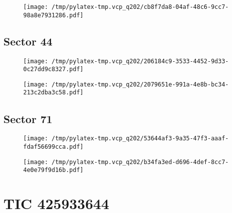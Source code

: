 \documentclass{report}%
\begin{document}
%


\begin{figure}[H]%
\begin{center}%
\centering%
\texttt{[image: /tmp/pylatex-tmp.vcp\_q202/cb8f7da8-04af-48c6-9cc7-98a8e7931286.pdf]}%
\end{center}%
\end{figure}

%
\subsection{Sector 44}%
\label{subsec:5983663344}%


\begin{figure}[H]%
\begin{center}%
\centering%
\texttt{[image: /tmp/pylatex-tmp.vcp\_q202/206184c9-3533-4452-9d33-0c27dd9c8327.pdf]}%
\end{center}%
\end{figure}

%


\begin{figure}[H]%
\begin{center}%
\centering%
\texttt{[image: /tmp/pylatex-tmp.vcp\_q202/2079651e-991a-4e8b-bc34-213c2dba3c58.pdf]}%
\end{center}%
\end{figure}

%
\subsection{Sector 71}%
\label{subsec:5983663371}%


\begin{figure}[H]%
\begin{center}%
\centering%
\texttt{[image: /tmp/pylatex-tmp.vcp\_q202/53644af3-9a35-47f3-aaaf-fdaf56699cca.pdf]}%
\end{center}%
\end{figure}

%


\begin{figure}[H]%
\begin{center}%
\centering%
\texttt{[image: /tmp/pylatex-tmp.vcp\_q202/b34fa3ed-d696-4def-8cc7-4e0e79f9d16b.pdf]}%
\end{center}%
\end{figure}

%
\section{TIC 425933644}%
\label{sec:TIC425933644}%
\end{document}
